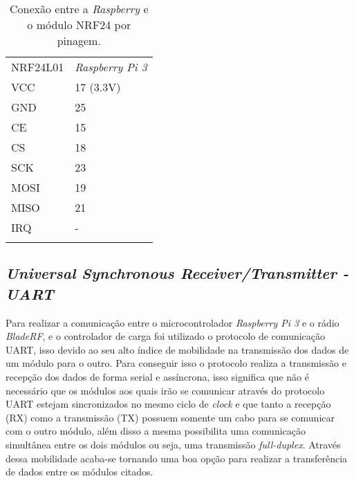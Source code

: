    
  \begin{table}[h]
 \centering
 {\renewcommand\arraystretch{1.25}
 \caption{Conexão entre a \emph{Raspberry} e o módulo NRF24 por pinagem.}
 \begin{tabular}{ l l }
  \cline{1-1}\cline{2-2}  
    \multicolumn{1}{|p{3.850cm}|}{NRF24L01 \centering } &
    \multicolumn{1}{p{4.217cm}|}{\emph{Raspberry Pi 3} \centering }
  \\  
  \cline{1-1}\cline{2-2}  
    \multicolumn{1}{|p{3.850cm}|}{VCC \centering } &
    \multicolumn{1}{p{4.217cm}|}{17 (3.3V) \centering }
  \\  
  \cline{1-1}\cline{2-2}  
    \multicolumn{1}{|p{3.850cm}|}{GND \centering } &
    \multicolumn{1}{p{4.217cm}|}{25  \centering }
  \\  
  \cline{1-1}\cline{2-2}  
    \multicolumn{1}{|p{3.850cm}|}{CE \centering } &
    \multicolumn{1}{p{4.217cm}|}{15 \centering }
  \\  
  \cline{1-1}\cline{2-2}  
    \multicolumn{1}{|p{3.850cm}|}{CS \centering } &
    \multicolumn{1}{p{4.217cm}|}{18 \centering }
  \\  
  \cline{1-1}\cline{2-2}  
    \multicolumn{1}{|p{3.850cm}|}{SCK \centering } &
    \multicolumn{1}{p{4.217cm}|}{23 \centering }
  \\  
  \cline{1-1}\cline{2-2}  
    \multicolumn{1}{|p{3.850cm}|}{MOSI \centering } &
    \multicolumn{1}{p{4.217cm}|}{19 \centering }
  \\  
  \cline{1-1}\cline{2-2}  
    \multicolumn{1}{|p{3.850cm}|}{MISO \centering } &
    \multicolumn{1}{p{4.217cm}|}{21 \centering }
  \\  
  \cline{1-1}\cline{2-2}  
    \multicolumn{1}{|p{3.850cm}|}{IRQ \centering } &
    \multicolumn{1}{p{4.217cm}|}{- \centering }
  \\  
  \hline
\label{tabelanrf}
 \end{tabular} }
\end{table}  


\subsection{\emph{Universal Synchronous Receiver/Transmitter - UART}}
    Para realizar a comunicação entre o microcontrolador \emph{Raspberry Pi 3} e o rádio \emph{BladeRF}, e o controlador de carga foi utilizado o protocolo de comunicação UART, isso devido ao seu alto índice de mobilidade na transmissão dos dados de um módulo para o outro. Para conseguir isso o protocolo realiza a transmissão e recepção dos dados de forma serial e assíncrona, isso significa que não é necessário que os módulos aos quais irão se comunicar através do protocolo UART estejam sincronizados no mesmo ciclo de \emph{clock} e que tanto a recepção (RX) como a transmissão (TX) possuem somente um cabo para se comunicar com o outro módulo, além disso a mesma possibilita uma comunicação simultânea entre os dois módulos ou seja, uma transmissão \emph{full-duplex}. Através dessa mobilidade acaba-se tornando uma boa opção para realizar a transferência de dados entre os módulos citados.
    
